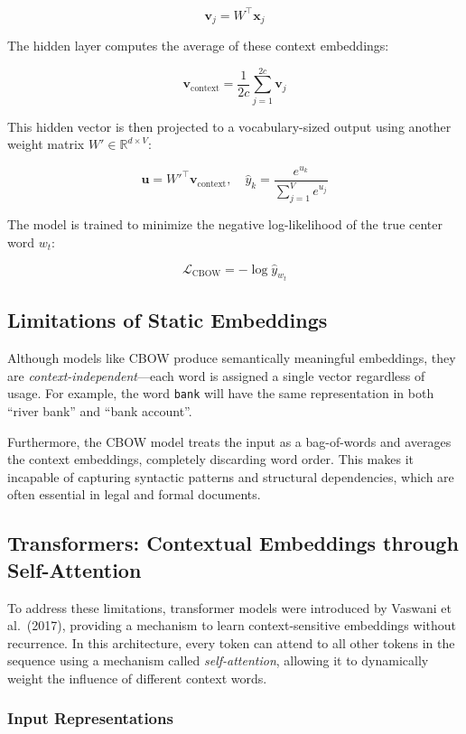\documentclass{article}
\begin{document}
\[
\mathbf{v}_j = W^\top \mathbf{x}_j
\]

The hidden layer computes the average of these context embeddings:

\[
\mathbf{v}_{\text{context}} = \frac{1}{2c} \sum_{j=1}^{2c} \mathbf{v}_j
\]

This hidden vector is then projected to a vocabulary-sized output using another weight matrix $W' \in \mathbb{R}^{d \times V}$:

\[
\mathbf{u} = W'^\top \mathbf{v}_{\text{context}}, \quad \hat{y}_k = \frac{e^{u_k}}{\sum_{j=1}^{V} e^{u_j}}
\]

The model is trained to minimize the negative log-likelihood of the true center word $w_t$:

\[
\mathcal{L}_{\text{CBOW}} = -\log \hat{y}_{w_t}
\]

\subsection{Limitations of Static Embeddings}

Although models like CBOW produce semantically meaningful embeddings, they are \emph{context-independent}—each word is assigned a single vector regardless of usage. For example, the word \texttt{bank} will have the same representation in both “river bank” and “bank account”.

Furthermore, the CBOW model treats the input as a bag-of-words and averages the context embeddings, completely discarding word order. This makes it incapable of capturing syntactic patterns and structural dependencies, which are often essential in legal and formal documents.

\subsection{Transformers: Contextual Embeddings through Self-Attention}

To address these limitations, transformer models were introduced by Vaswani et al.~(2017), \cite{vaswani2017attention} providing a mechanism to learn context-sensitive embeddings without recurrence. In this architecture, every token can attend to all other tokens in the sequence using a mechanism called \emph{self-attention}, allowing it to dynamically weight the influence of different context words.

\subsubsection{Input Representations}
\end{document}
